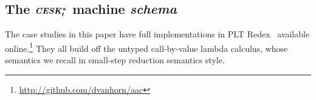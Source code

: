 
\subsection{The $\boldsymbol{\mathit{CESK^*_t}}$ machine \emph{schema}}

The case studies in this paper have full implementations in PLT Redex~\citep{dvanhorn:Felleisen2009Semantics} available online.\footnote{\url{http://github.com/dvanhorn/aac}}
They all build off the untyped call-by-value lambda calculus, whose semantics we recall in small-step reduction semantics style.


